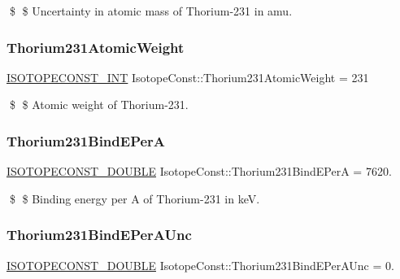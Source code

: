 \$ \$ Uncertainty in atomic mass of Thorium-\/231 in amu. \mbox{\label{group___isotope_const-_thorium-_th231_ga3e005eec631edddf10de5ca5aa36c87d}} 
\subsubsection{\texorpdfstring{Thorium231\+Atomic\+Weight}{Thorium231AtomicWeight}}
{\footnotesize\ttfamily \mbox{\hyperlink{group___isotope_const-_macros_ga5f18360b3e99483a35c32d789e62621c}{I\+S\+O\+T\+O\+P\+E\+C\+O\+N\+S\+T\+\_\+\+I\+NT}} Isotope\+Const\+::\+Thorium231\+Atomic\+Weight = 231}

\$ \$ Atomic weight of Thorium-\/231. \mbox{\label{group___isotope_const-_thorium-_th231_ga0e82fbff78257a68616f2c297c65f979}} 
\subsubsection{\texorpdfstring{Thorium231\+Bind\+E\+PerA}{Thorium231BindEPerA}}
{\footnotesize\ttfamily \mbox{\hyperlink{group___isotope_const-_macros_ga8f45a7272ce02c0b4c65c44636ed719a}{I\+S\+O\+T\+O\+P\+E\+C\+O\+N\+S\+T\+\_\+\+D\+O\+U\+B\+LE}} Isotope\+Const\+::\+Thorium231\+Bind\+E\+PerA = 7620.}

\$ \$ Binding energy per A of Thorium-\/231 in keV. \mbox{\label{group___isotope_const-_thorium-_th231_ga2fa9ca5ec14a434046a2f622f92c979c}} 
\subsubsection{\texorpdfstring{Thorium231\+Bind\+E\+Per\+A\+Unc}{Thorium231BindEPerAUnc}}
{\footnotesize\ttfamily \mbox{\hyperlink{group___isotope_const-_macros_ga8f45a7272ce02c0b4c65c44636ed719a}{I\+S\+O\+T\+O\+P\+E\+C\+O\+N\+S\+T\+\_\+\+D\+O\+U\+B\+LE}} Isotope\+Const\+::\+Thorium231\+Bind\+E\+Per\+A\+Unc = 0.}


